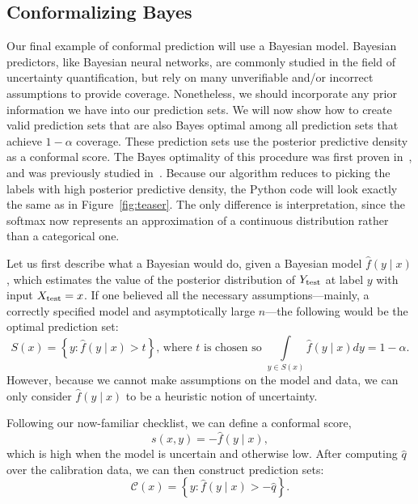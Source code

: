 \documentclass[10pt]{article}
\newcommand{\C}{\mathcal{C}}
\begin{document}
\subsection{Conformalizing Bayes}
Our final example of conformal prediction will use a Bayesian model.
Bayesian predictors, like Bayesian neural networks, are commonly studied in the field of uncertainty quantification, but rely on many unverifiable and/or incorrect assumptions to provide coverage.
Nonetheless, we should incorporate any prior information we have into our prediction sets.
We will now show how to create valid prediction sets that are also Bayes optimal among all prediction sets that achieve $1-\alpha$ coverage.
These prediction sets use the posterior predictive density as a conformal score.
The Bayes optimality of this procedure was first proven in~\cite{hoff2021bayes}, and was previously studied in~\cite{wasserman2011frasian,melluish2001comparing}.
Because our algorithm reduces to picking the labels with high posterior predictive density, the Python code will look exactly the same as in Figure~\ref{fig:teaser}.
The only difference is interpretation, since the softmax now represents an approximation of a continuous distribution rather than a categorical one.

Let us first describe what a Bayesian would do, given a Bayesian model $\hat{f}(y \mid x)$, which estimates the value of the posterior distribution of $Y_{\rm test}$ at label $y$ with input $X_{\rm test}=x$.
If one believed all the necessary assumptions---mainly, a correctly specified model and asymptotically large $n$---the following would be the optimal prediction set:
\begin{equation}
    S(x)=\left\{y : \hat{f}(y \mid x) > t \right\}\text{, where }t\text{ is chosen so }\int\limits_{y \in S(x)} \hat{f}(y \mid x) dy = 1-\alpha.
\end{equation}
However, because we cannot make assumptions on the model and data, we can only consider $\hat{f}(y \mid x)$ to be a heuristic notion of uncertainty.

Following our now-familiar checklist, we can define a conformal score,
\begin{equation}
    \label{eq:bayes-score}
    s(x,y) = -\hat{f}(y \mid x),
\end{equation}
which is high when the model is uncertain and otherwise low.
After computing $\hat{q}$ over the calibration data, we can then construct prediction sets:
\begin{equation}
    \label{eq:bayes-sets}
    \C(x) = \left\{ y : \hat{f}(y \mid x) > -\hat{q} \right\}.
\end{equation}
\end{document}
